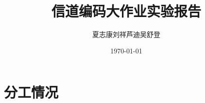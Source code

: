 \documentclass[lang=cn,11pt,a4paper,numbers]{elegantpaper}
\title{信道编码大作业实验报告}
\author{\kaishu\zihao{5} 夏志康\quad 刘祥\quad 芦迪\quad 吴舒登}
\institute{清华大学深圳国际研究生院 信息科学与技术学部，深计研19班}
\date{\today}
\begin{document}
\maketitle


\section{分工情况}


\end{document}
